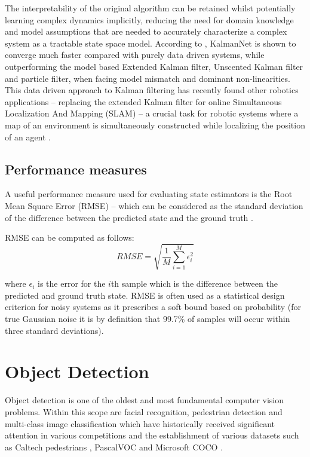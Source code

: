 \documentclass[a4paper,twoside,12pt]{report}
\begin{document}
The interpretability of the original algorithm can be retained whilst potentially learning complex dynamics implicitly, reducing the need for domain knowledge and model assumptions that are needed to accurately characterize a complex system as a tractable state space model. According to \cite{kalmannet}, KalmanNet is shown to converge much faster compared with purely data driven systems, while outperforming the model based Extended Kalman filter, Unscented Kalman filter and particle filter, when facing model mismatch and dominant non-linearities. This data driven approach to Kalman filtering has recently found other robotics applications -- replacing the extended Kalman filter for online Simultaneous Localization And Mapping (SLAM) -- a crucial task for robotic systems where a map of an environment is simultaneously constructed while localizing the position of an agent \citep{slam}.

\subsection{Performance measures}

A useful performance measure used for evaluating state estimators is the Root Mean Square Error (RMSE) -- which can be considered as the standard deviation of the difference between the predicted state and the ground truth \citep{kalmanperform}.

RMSE can be computed as follows:
\begin{equation}
RMSE = \sqrt{\frac{1}{M}\sum^{M}_{i=1}\epsilon_{i}^{2}}
\end{equation}

where $\epsilon_{i}$ is the error for the $i$th sample which is the difference between the predicted and ground truth state. RMSE is often used as a statistical design criterion for noisy systems as it prescribes a soft bound based on probability (for true Gaussian noise it is by definition that 99.7\% of samples will occur within three standard deviations).

\newpage
\section{Object Detection}

Object detection is one of the oldest and most fundamental computer vision problems. Within this scope are facial recognition, pedestrian detection and multi-class image classification which have historically received significant attention in various competitions and the establishment of various datasets such as Caltech pedestrians \citep{peddetect}, PascalVOC \citep{vocdataset} and Microsoft COCO \citep{coco}.
\end{document}
